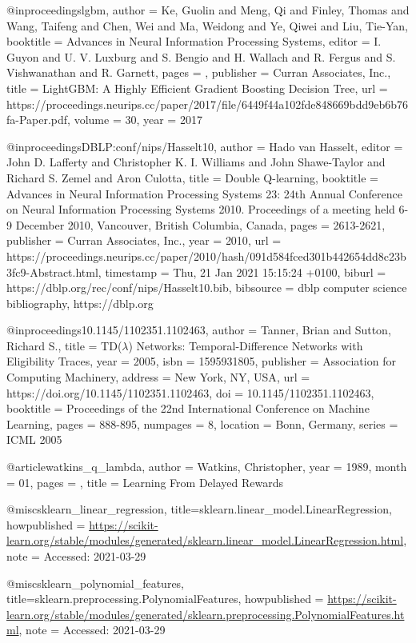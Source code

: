 
@inproceedings{lgbm,
 author = {Ke, Guolin and Meng, Qi and Finley, Thomas and Wang, Taifeng and Chen, Wei and Ma, Weidong and Ye, Qiwei and Liu, Tie-Yan},
 booktitle = {Advances in Neural Information Processing Systems},
 editor = {I. Guyon and U. V. Luxburg and S. Bengio and H. Wallach and R. Fergus and S. Vishwanathan and R. Garnett},
 pages = {},
 publisher = {Curran Associates, Inc.},
 title = {LightGBM: A Highly Efficient Gradient Boosting Decision Tree},
 url = {https://proceedings.neurips.cc/paper/2017/file/6449f44a102fde848669bdd9eb6b76fa-Paper.pdf},
 volume = {30},
 year = {2017}
}

@inproceedings{DBLP:conf/nips/Hasselt10,
  author    = {Hado van Hasselt},
  editor    = {John D. Lafferty and
               Christopher K. I. Williams and
               John Shawe{-}Taylor and
               Richard S. Zemel and
               Aron Culotta},
  title     = {Double Q-learning},
  booktitle = {Advances in Neural Information Processing Systems 23: 24th Annual
               Conference on Neural Information Processing Systems 2010. Proceedings
               of a meeting held 6-9 December 2010, Vancouver, British Columbia,
               Canada},
  pages     = {2613-2621},
  publisher = {Curran Associates, Inc.},
  year      = {2010},
  url       = {https://proceedings.neurips.cc/paper/2010/hash/091d584fced301b442654dd8c23b3fc9-Abstract.html},
  timestamp = {Thu, 21 Jan 2021 15:15:24 +0100},
  biburl    = {https://dblp.org/rec/conf/nips/Hasselt10.bib},
  bibsource = {dblp computer science bibliography, https://dblp.org}
}

@inproceedings{10.1145/1102351.1102463,
  author = {Tanner, Brian and Sutton, Richard S.},
  title = {TD({$\lambda$}) Networks: Temporal-Difference Networks with Eligibility Traces},
  year = {2005},
  isbn = {1595931805},
  publisher = {Association for Computing Machinery},
  address = {New York, NY, USA},
  url = {https://doi.org/10.1145/1102351.1102463},
  doi = {10.1145/1102351.1102463},
  booktitle = {Proceedings of the 22nd International Conference on Machine Learning},
  pages = {888-895},
  numpages = {8},
  location = {Bonn, Germany},
  series = {ICML 2005}
  }

@article{watkins_q_lambda,
  author = {Watkins, Christopher},
  year = {1989},
  month = {01},
  pages = {},
  title = {Learning From Delayed Rewards}
}

@misc{sklearn_linear_regression,
  title={sklearn.linear\_model.LinearRegression},
  howpublished = {\url{https://scikit-learn.org/stable/modules/generated/sklearn.linear_model.LinearRegression.html}},
  note = {Accessed: 2021-03-29}
} 

@misc{sklearn_polynomial_features,
  title={sklearn.preprocessing.PolynomialFeatures},
  howpublished = {\url{https://scikit-learn.org/stable/modules/generated/sklearn.preprocessing.PolynomialFeatures.html}},
  note = {Accessed: 2021-03-29}
}


